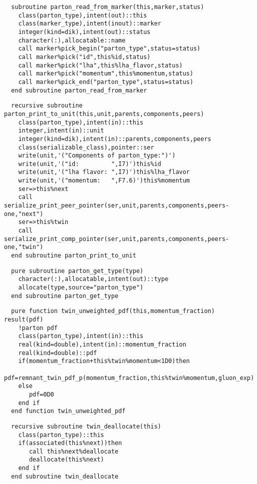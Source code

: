 \begin{Verbatim}
  subroutine parton_read_from_marker(this,marker,status)
    class(parton_type),intent(out)::this
    class(marker_type),intent(inout)::marker
    integer(kind=dik),intent(out)::status
    character(:),allocatable::name
    call marker%pick_begin("parton_type",status=status)
    call marker%pick("id",this%id,status)
    call marker%pick("lha",this%lha_flavor,status)
    call marker%pick("momentum",this%momentum,status)
    call marker%pick_end("parton_type",status=status)
  end subroutine parton_read_from_marker
\end{Verbatim}
\begin{Verbatim}
  recursive subroutine parton_print_to_unit(this,unit,parents,components,peers)
    class(parton_type),intent(in)::this
    integer,intent(in)::unit
    integer(kind=dik),intent(in)::parents,components,peers
    class(serializable_class),pointer::ser
    write(unit,'("Components of parton_type:")')
    write(unit,'("id:         ",I7)')this%id
    write(unit,'("lha flavor: ",I7)')this%lha_flavor
    write(unit,'("momentum:   ",F7.6)')this%momentum
    ser=>this%next
    call serialize_print_peer_pointer(ser,unit,parents,components,peers-one,"next")
    ser=>this%twin
    call serialize_print_comp_pointer(ser,unit,parents,components,peers-one,"twin")
  end subroutine parton_print_to_unit
\end{Verbatim}
\begin{Verbatim}
  pure subroutine parton_get_type(type)
    character(:),allocatable,intent(out)::type
    allocate(type,source="parton_type")
  end subroutine parton_get_type
\end{Verbatim}
\begin{Verbatim}
  pure function twin_unweighted_pdf(this,momentum_fraction) result(pdf)
    !parton pdf
    class(parton_type),intent(in)::this
    real(kind=double),intent(in)::momentum_fraction
    real(kind=double)::pdf
    if(momentum_fraction+this%twin%momentum<1D0)then
       pdf=remnant_twin_pdf_p(momentum_fraction,this%twin%momentum,gluon_exp)
    else
       pdf=0D0
    end if
  end function twin_unweighted_pdf
\end{Verbatim}
\begin{Verbatim}
  recursive subroutine twin_deallocate(this)
    class(parton_type)::this
    if(associated(this%next))then
       call this%next%deallocate
       deallocate(this%next)
    end if
  end subroutine twin_deallocate
\end{Verbatim}
